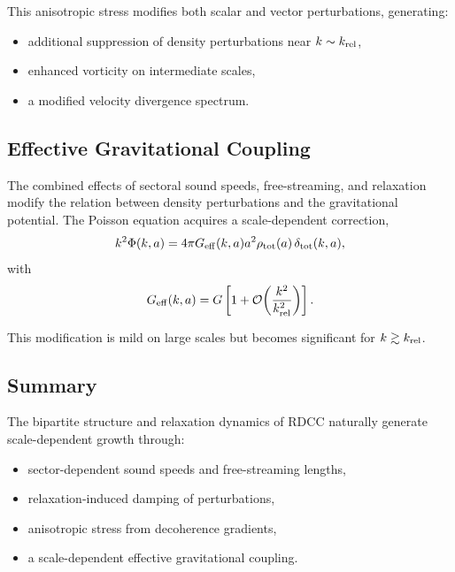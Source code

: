\documentclass[11pt,a4paper]{article}
\begin{document}
This anisotropic stress modifies both scalar and vector perturbations, generating:

\begin{itemize}
\item additional suppression of density perturbations near $k \sim k_{\rm rel}$,
\item enhanced vorticity on intermediate scales,
\item a modified velocity divergence spectrum.
\end{itemize}

\subsection{Effective Gravitational Coupling}

The combined effects of sectoral sound speeds, free-streaming, and relaxation modify the
relation between density perturbations and the gravitational potential. The Poisson equation
acquires a scale-dependent correction,
\begin{equation}
k^2 \Phi(k,a)
= 4\pi G_{\rm eff}(k,a) a^2 \rho_{\rm tot}(a)\,\delta_{\rm tot}(k,a),
\end{equation}
with
\begin{equation}
G_{\rm eff}(k,a)
= G \left[ 1 + \mathcal{O}\!\left(\frac{k^2}{k_{\rm rel}^2}\right) \right].
\end{equation}

This modification is mild on large scales but becomes significant for
$k \gtrsim k_{\rm rel}$.

\subsection{Summary}

The bipartite structure and relaxation dynamics of RDCC naturally generate scale-dependent
growth through:

\begin{itemize}
\item sector-dependent sound speeds and free-streaming lengths,
\item relaxation-induced damping of perturbations,
\item anisotropic stress from decoherence gradients,
\item a scale-dependent effective gravitational coupling.
\end{itemize}
\end{document}
